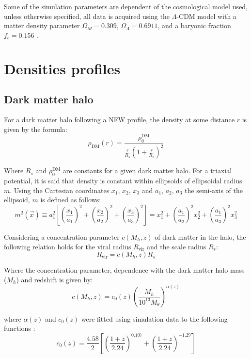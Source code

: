 	Some of the simulation parameters are dependent of the cosmological model used, unless otherwise specified, all data is acquired using the $\Lambda$-CDM model with a matter density parameter $\Omega_M = 0.309$, $\Omega_\Lambda = 0.6911$, and a baryonic fraction $f_b = 0.156$ \cite{choksi2017recoiling}. 
	\section{Densities profiles}
		\subsection{Dark matter halo}
			For a dark matter halo following a NFW profile, the density at some distance $r$ is given by the formula:
			\begin{equation}\label{eq: dmdensity}
				\rho_\text{DM}(r) = \dfrac{\rho_0^\text{DM}}{\frac{r}{R_s}\left(1 + \frac{r}{R_s}\right)^2}
			\end{equation}
			
			Where $R_s$ and $\rho_0^\text{DM}$ are constants for a given dark matter halo. For a triaxial potential, it is said that density is constant within ellipsoids of ellipsoidal radius $m$. Using the Cartesian coordinates $x_1$, $x_2$, $x_3$ and $a_1$, $a_2$, $a_3$ the semi-axis of the ellipsoid, $m$ is defined as follows:
			\begin{equation}
				m^2(\vec{x}) \equiv a_1^2\left[\left(\dfrac{x_1}{a_1}\right)^2 + \left(\dfrac{x_2}{a_2}\right)^2 + \left(\dfrac{x_3}{a_3}\right)^2\right] = x_1^2 + \left(\dfrac{a_1}{a_2}\right)^2x_2^2 + \left(\dfrac{a_1}{a_3}\right)^2x_3^2
			\end{equation}
			
			Considering a concentration parameter $c(M_h, z)$ of dark matter in the halo, the following relation holds for the viral radius $R_\text{vir}$ and the scale radius $R_s$:
			\begin{equation}\label{eq: virialConcentration}
				R_\text{vir} = c(M_h, z)R_s
			\end{equation}
			
			Where the concentration parameter, dependence with the dark matter halo mass ($M_h$) and redshift is given by: 
			\begin{equation}
			c(M_h, z) = c_0(z)\left(\dfrac{M_h}{10^{13}M_\theta}\right)^{\alpha(z)}
			\end{equation}
			
			where $\alpha(z)$ and $c_0(z)$ were fitted using simulation data to the following functions \cite{choksi2017recoiling}:
			\begin{equation}
				c_0(z) = \dfrac{4.58}{2}\left[\left(\dfrac{1 + z}{2.24}\right)^{0.107} + \left(\dfrac{1 + z}{2.24}\right)^{-1.29}\right]
			\end{equation}
			
